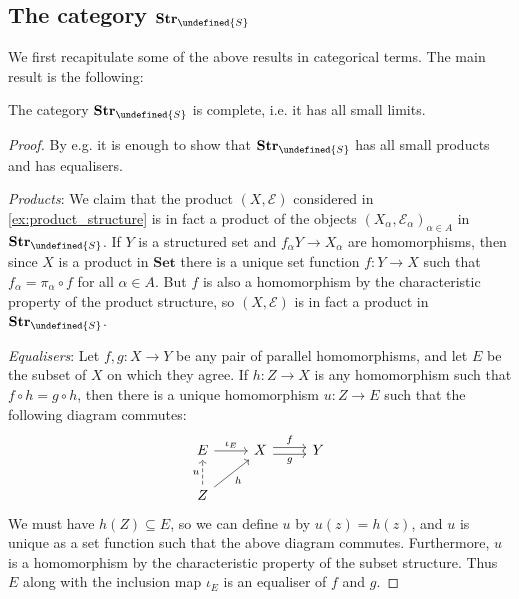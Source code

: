 \documentclass[article, a4paper, 11pt, oneside]{memoir}
\let\mathfrak\undefined
\numberwithin{equation}{chapter}
\newcommand{\calE}{\mathcal{E}}
\newcommand{\strucS}{\mathfrak{S}}
\newcommand{\ncat}[1]{\mathbf{#1}} %
\newcommand{\catSet}{\ncat{Set}} %
\newcommand{\catStruc}[1]{\ncat{Str}_{#1}} %
\newcommand{\catStrucS}{\catStruc{\strucS}} %
\begin{document}
\subsection{The category $\catStrucS$}

We first recapitulate some of the above results in categorical terms. The main result is the following:

\begin{theorem}[Completeness of $\catStrucS$]
    The category $\catStrucS$ is complete, i.e. it has all small limits.
\end{theorem}

\begin{proof}
    By e.g. \cite[Theorem~60]{smithcategory} it is enough to show that $\catStrucS$ has all small products and has equalisers.

    \emph{Products}: We claim that the product $(X, \calE)$ considered in \cref{ex:product_structure} is in fact a product of the objects $(X_\alpha, \calE_\alpha)_{\alpha \in A}$ in $\catStrucS$. If $Y$ is a structured set and $f_\alpha Y \to X_\alpha$ are homomorphisms, then since $X$ is a product in $\catSet$ there is a unique set function $f \colon Y \to X$ such that $f_\alpha = \pi_\alpha \circ f$ for all $\alpha \in A$. But $f$ is also a homomorphism by the characteristic property of the product structure, so $(X, \calE)$ is in fact a product in $\catStrucS$.

    \emph{Equalisers}: Let $f,g \colon X \to Y$ be any pair of parallel homomorphisms, and let $E$ be the subset of $X$ on which they agree. If $h \colon Z \to X$ is any homomorphism such that $f \circ h = g \circ h$, then there is a unique homomorphism $u \colon Z \to E$ such that the following diagram commutes:
    \begin{equation*}
        \begin{tikzcd}
            E
                \ar[r, "\iota_E"]
            & X
                \ar[r, shift left, "f"]
                \ar[r, shift right, "g", swap]
            & Y \\
            Z
                \ar[u, dashed, "u"]
                \ar[ur, "h", swap]
        \end{tikzcd}
    \end{equation*}
    We must have $h(Z) \subseteq E$, so we can define $u$ by $u(z) = h(z)$, and $u$ is unique as a set function such that the above diagram commutes. Furthermore, $u$ is a homomorphism by the characteristic property of the subset structure. Thus $E$ along with the inclusion map $\iota_E$ is an equaliser of $f$ and $g$.
\end{proof}
\end{document}
